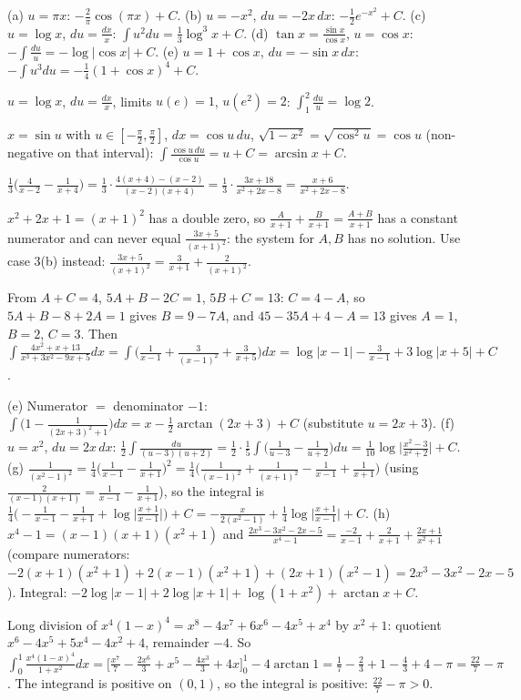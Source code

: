  (a) $u=\pi x$: $-\frac2\pi\cos(\pi x)+C$. (b) $u=-x^2$, $du=-2x\,dx$: $-\frac12e^{-x^2}+C$. (c) $u=\log x$, $du=\frac{dx}x$: $\int u^2du=\frac13\log^3x+C$. (d) $\tan x=\frac{\sin x}{\cos x}$, $u=\cos x$: $-\int\frac{du}u=-\log|\cos x|+C$. (e) $u=1+\cos x$, $du=-\sin x\,dx$: $-\int u^3du=-\frac14(1+\cos x)^4+C$.

 $u=\log x$, $du=\frac{dx}x$, limits $u(e)=1$, $u(e^2)=2$: $\int_1^2\frac{du}u=\log2$.

 $x=\sin u$ with $u\in[-\frac\pi2,\frac\pi2]$, $dx=\cos u\,du$, $\sqrt{1-x^2}=\sqrt{\cos^2u}=\cos u$ (non-negative on that interval): $\int\frac{\cos u\,du}{\cos u}=u+C=\arcsin x+C$.

 $\frac13\Big(\frac4{x-2}-\frac1{x+4}\Big)=\frac13\cdot\frac{4(x+4)-(x-2)}{(x-2)(x+4)}=\frac13\cdot\frac{3x+18}{x^2+2x-8}=\frac{x+6}{x^2+2x-8}$. \checkmark

 $x^2+2x+1=(x+1)^2$ has a double zero, so $\frac A{x+1}+\frac B{x+1}=\frac{A+B}{x+1}$ has a constant numerator and can never equal $\frac{3x+5}{(x+1)^2}$: the system for $A,B$ has no solution. Use case 3(b) instead: $\frac{3x+5}{(x+1)^2}=\frac3{x+1}+\frac2{(x+1)^2}$.

 From $A+C=4$, $5A+B-2C=1$, $5B+C=13$: $C=4-A$, so $5A+B-8+2A=1$ gives $B=9-7A$, and $45-35A+4-A=13$ gives $A=1$, $B=2$, $C=3$. Then $\int\frac{4x^2+x+13}{x^3+3x^2-9x+5}dx=\int\Big(\frac1{x-1}+\frac3{(x-1)^2}+\frac3{x+5}\Big)dx=\log|x-1|-\frac3{x-1}+3\log|x+5|+C$.

 (e) Numerator $=$ denominator $-1$: $\int\Big(1-\frac1{(2x+3)^2+1}\Big)dx=x-\frac12\arctan(2x+3)+C$ (substitute $u=2x+3$). (f) $u=x^2$, $du=2x\,dx$: $\frac12\int\frac{du}{(u-3)(u+2)}=\frac12\cdot\frac15\int\Big(\frac1{u-3}-\frac1{u+2}\Big)du=\frac1{10}\log\Big|\frac{x^2-3}{x^2+2}\Big|+C$. (g) $\frac1{(x^2-1)^2}=\frac14\Big(\frac1{x-1}-\frac1{x+1}\Big)^2=\frac14\Big(\frac1{(x-1)^2}+\frac1{(x+1)^2}-\frac1{x-1}+\frac1{x+1}\Big)$ (using $\frac2{(x-1)(x+1)}=\frac1{x-1}-\frac1{x+1}$), so the integral is $\frac14\Big(-\frac1{x-1}-\frac1{x+1}+\log\Big|\frac{x+1}{x-1}\Big|\Big)+C=-\frac{x}{2(x^2-1)}+\frac14\log\Big|\frac{x+1}{x-1}\Big|+C$. (h) $x^4-1=(x-1)(x+1)(x^2+1)$ and $\frac{2x^3-3x^2-2x-5}{x^4-1}=\frac{-2}{x-1}+\frac2{x+1}+\frac{2x+1}{x^2+1}$ (compare numerators: $-2(x+1)(x^2+1)+2(x-1)(x^2+1)+(2x+1)(x^2-1)=2x^3-3x^2-2x-5$). Integral: $-2\log|x-1|+2\log|x+1|+\log(1+x^2)+\arctan x+C$.

 Long division of $x^4(1-x)^4=x^8-4x^7+6x^6-4x^5+x^4$ by $x^2+1$: quotient $x^6-4x^5+5x^4-4x^2+4$, remainder $-4$. So $\int_0^1\frac{x^4(1-x)^4}{1+x^2}dx=\Big[\frac{x^7}7-\frac{2x^6}3+x^5-\frac{4x^3}3+4x\Big]_0^1-4\arctan1=\frac17-\frac23+1-\frac43+4-\pi=\frac{22}7-\pi$. The integrand is positive on $(0,1)$, so the integral is positive: $\frac{22}7-\pi>0$.

